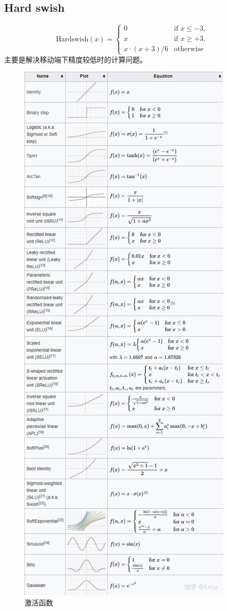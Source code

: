 \documentclass{article}
\begin{document}
\subsection{Hard swish}
\begin{equation}
        \text{Hardswish}(x) = \begin{cases}
            0 & \text{if~} x \le -3, \\
            x & \text{if~} x \ge +3, \\
            x \cdot (x + 3) /6 & \text{otherwise}
        \end{cases}
\end{equation}
主要是解决移动端下精度较低时的计算问题。
\begin{figure}[htp]
\centering
\includegraphics[scale=0.4]{images/activation/activation.jpg}
\caption{激活函数}
\end{figure}
\end{document}
